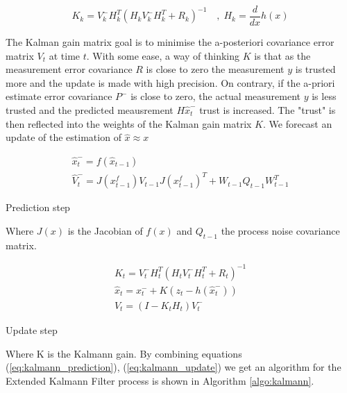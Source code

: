 \documentclass[mscthesis]{usiinfthesis}
\begin{document}
\[
K_k = V_k^- H^T_k (H_k V_k^- H^T_k + R_k)^{-1}  \quad , \; H_k = \frac{d}{dx} h(x)
\]

The Kalman gain matrix goal is to minimise the a-posteriori covariance error matrix $V_t$ at time $t$. With some ease, a way of thinking $K$ is that as the measurement error covariance $R$ is close to zero the measurement $y$ is trusted more and the update is made with high precision. On contrary, if the a-priori estimate error covariance $P^-$ is close to zero, the actual measurement $y$ is less trusted and the predicted meausrement $H\hat{x}_t^-$ trust is increased. The "trust" is then reflected into the weights of the Kalman gain matrix $K$. We forecast an update of the estimation of $\hat{x} \approx x$

\begin{eqfloat}[H]
\begin{equation}
\begin{array}{l}
\hat{x}_t^- = f(\hat{x}_{t-1}) \\
\hat{V}_t^- = J(x^f_{t-1}) V_{t-1} J(x^f_{t-1})^T + W_{t-1} Q_{t-1} W_{t-1}^T
\end{array}
\label{eq:kalman_predict}
\end{equation}
\caption{Prediction step}
\label{eq:kalmann_prediction}
\end{eqfloat}

Where $J(x)$ is the Jacobian of $f(x)$ and $Q_{t-1}$ the process noise covariance matrix.


\begin{eqfloat}[H]
\begin{equation}
\begin{array}{l}
K_t = V_t^- H^T_t (H_t V_t^- H^T_t + R_t)^{-1} \\
\hat{x}_t = x_t^- + K (z_t - h(\hat{x}_t^-)) \\
V_t = (I-K_t H_t)V_t^-
\end{array}
\label{eq:kalman_update}
\end{equation}
\caption{Update step}
\label{eq:kalmann_update}
\end{eqfloat}

Where K is the Kalmann gain. By combining equations (\ref{eq:kalmann_prediction}), (\ref{eq:kalmann_update}) we get an algorithm for the Extended Kalmann Filter process is shown in Algorithm \ref{algo:kalmann}. 
\end{document}
